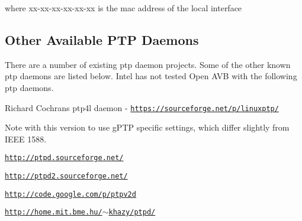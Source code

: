 where xx-\/xx-\/xx-\/xx-\/xx-\/xx is the mac address of the local interface

\subsection*{Other Available P\+TP Daemons }

There are a number of existing ptp daemon projects. Some of the other known ptp daemons are listed below. Intel has not tested Open A\+VB with the following ptp daemons.


\begin{DoxyItemize}
\item Richard Cochran\textquotesingle{}s ptp4l daemon -\/ \href{https://sourceforge.net/p/linuxptp/}{\tt https\+://sourceforge.\+net/p/linuxptp/}

Note with this version to use g\+P\+TP specific settings, which differ slightly from I\+E\+EE 1588.
\item \href{http://ptpd.sourceforge.net/}{\tt http\+://ptpd.\+sourceforge.\+net/}
\item \href{http://ptpd2.sourceforge.net/}{\tt http\+://ptpd2.\+sourceforge.\+net/}
\item \href{http://code.google.com/p/ptpv2d}{\tt http\+://code.\+google.\+com/p/ptpv2d}
\item \href{http://home.mit.bme.hu/~khazy/ptpd/}{\tt http\+://home.\+mit.\+bme.\+hu/$\sim$khazy/ptpd/} 
\end{DoxyItemize}